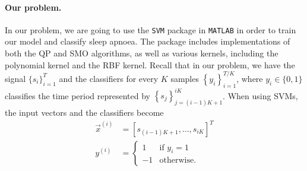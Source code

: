 \paragraph{Our problem.}
	In our problem, we are going to use the \verb!SVM! package in \verb!MATLAB!\textsuperscript{\textregistered} in order to train our model and classify sleep apnoea. The package includes implementations of both the QP and SMO algorithms, as well as various kernels, including the polynomial kernel and the RBF kernel. Recall that in our problem, we have the signal $\{ s_i \}_{i = 1}^T$ and the classifiers for every $K$ samples $\left\{ y_i \right\}_{i = 1}^{T/K}$, where $y_i \in \{0, 1\}$ classifies the time period represented by $\left\{ s_j \right\}_{j = (i - 1)K + 1}^{iK}$. When using SVMs, the input vectors and the classifiers become
	\begin{align*}
		\vec x^{(i)} 	& = [ s_{ (i - 1)K + 1}, \dotsc, s_{iK} ]^T \\
		y^{(i)} 	& = 
		\begin{cases}
			1	& \text{if } y_i  = 1 \\
			-1	& \text{otherwise.}
		\end{cases}
	\end{align*}